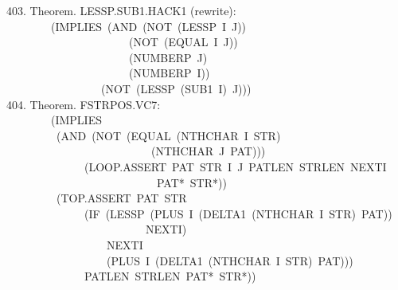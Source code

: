 \documentclass[10pt]{book}
\newenvironment{pubasis}{\begin{flushleft}}{\end{flushleft}}
\begin{document}
\begin{pubasis}
403.    Theorem.  LESSP.SUB1.HACK1 (rewrite):\\
~~~~~~~~(IMPLIES~(AND~(NOT~(LESSP~I~J))\\
~~~~~~~~~~~~~~~~~~~~~~(NOT~(EQUAL~I~J))\\
~~~~~~~~~~~~~~~~~~~~~~(NUMBERP~J)\\
~~~~~~~~~~~~~~~~~~~~~~(NUMBERP~I))\\
~~~~~~~~~~~~~~~~~(NOT~(LESSP~(SUB1~I)~J)))\\

404.    Theorem.  FSTRPOS.VC7:\\
~~~~~~~~(IMPLIES\\
~~~~~~~~~(AND~(NOT~(EQUAL~(NTHCHAR~I~STR)\\
~~~~~~~~~~~~~~~~~~~~~~~~~~(NTHCHAR~J~PAT)))\\
~~~~~~~~~~~~~~(LOOP.ASSERT~PAT~STR~I~J~PATLEN~STRLEN~NEXTI\\
~~~~~~~~~~~~~~~~~~~~~~~~~~~PAT*~STR*))\\
~~~~~~~~~(TOP.ASSERT~PAT~STR\\
~~~~~~~~~~~~~~(IF~(LESSP~(PLUS~I~(DELTA1~(NTHCHAR~I~STR)~PAT))\\
~~~~~~~~~~~~~~~~~~~~~~~~~NEXTI)\\
~~~~~~~~~~~~~~~~~~NEXTI\\
~~~~~~~~~~~~~~~~~~(PLUS~I~(DELTA1~(NTHCHAR~I~STR)~PAT)))\\
~~~~~~~~~~~~~~PATLEN~STRLEN~PAT*~STR*))\\
\end{pubasis}
\end{document}
